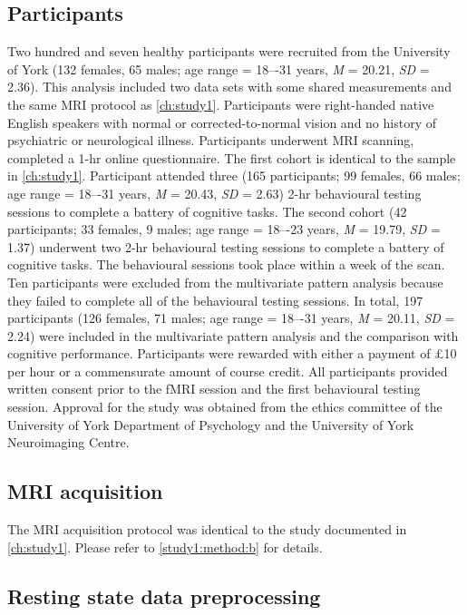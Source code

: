\subsection{Participants}
\label{study3:method:a}
Two hundred and seven healthy participants were recruited from the University of York (132 females, 65 males; age range = 18–-31 years, \textit{M} = 20.21, \textit{SD} = 2.36).
This analysis included two data sets with some shared measurements and the same MRI protocol as \cref{ch:study1}.
Participants were right-handed native English speakers with normal or corrected-to-normal vision and no history of psychiatric or neurological illness. Participants underwent MRI scanning, completed a 1-hr online questionnaire. The first cohort is identical to the sample in \cref{ch:study1}. Participant attended three
(165 participants; 99 females, 66 males; age range = 18–-31 years, \textit{M} = 20.43, \textit{SD} = 2.63) 2-hr behavioural testing sessions to complete a battery of cognitive tasks.
The second cohort (42 participants; 33 females, 9 males; age range = 18–-23 years, \textit{M} = 19.79, \textit{SD} = 1.37) underwent two 2-hr behavioural testing sessions to complete a battery of cognitive tasks. The behavioural sessions took place within a week of the scan. Ten participants were excluded from the multivariate pattern analysis because they failed to complete all of the behavioural testing sessions. In total, 197 participants (126 females, 71 males; age range = 18–-31 years, \textit{M} = 20.11, \textit{SD} = 2.24) were included in the multivariate pattern analysis and the comparison with cognitive performance. Participants were rewarded with either a payment of \pounds 10 per hour or a commensurate amount of course credit. All participants provided written consent prior to the fMRI session and the first behavioural testing session. Approval for the study was obtained from the ethics committee of the University of York Department of Psychology and the University of York Neuroimaging Centre.

\subsection{MRI acquisition}
\label{study3:method:b}
The MRI acquisition protocol was identical to the study documented in \cref{ch:study1}. Please refer to \cref{study1:method:b} for details.

\subsection{Resting state data preprocessing}
\label{study3:method:c}

